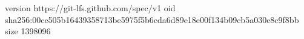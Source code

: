 version https://git-lfs.github.com/spec/v1
oid sha256:00ce505b16439358713be5975f5b6cda6d89e18e00f134b09cb5a030e8c9f8bb
size 1398096
